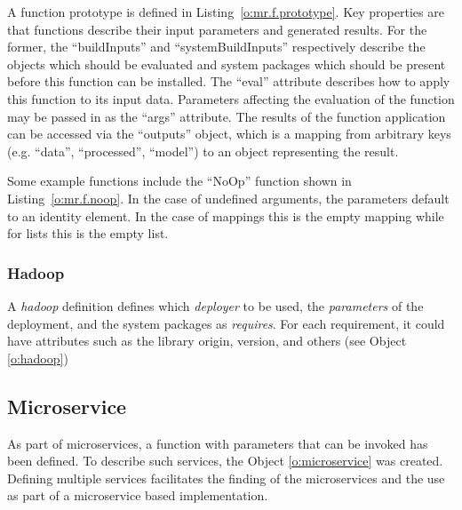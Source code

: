 \documentclass[10pt]{article}
\begin{document}
A function prototype is defined in Listing~\ref{o:mr.f.prototype}.
Key properties are that functions describe their input parameters and
generated results. For the former, the ``buildInputs'' and
``systemBuildInputs'' respectively describe the objects which should
be evaluated and system packages which should be present before this
function can be installed. The ``eval'' attribute describes how to
apply this function to its input data. Parameters affecting the
evaluation of the function may be passed in as the ``args'' attribute.
The results of the function application can be accessed via the
``outputs'' object, which is a mapping from arbitrary keys
(e.g. ``data'', ``processed'', ``model'') to an object representing
the result.



Some example functions include the ``NoOp'' function shown in
Listing~\ref{o:mr.f.noop}.  In the case of undefined arguments,
the parameters default to an identity element. In the case of mappings
this is the empty mapping while for lists this is the empty list.



\subsubsection{Hadoop}

A \textit{hadoop} definition defines which \textit{deployer} to be used,
the \textit{parameters} of the deployment, and the system packages as
\textit{requires}. For each requirement, it could have attributes such
as the library origin, version, and others (see Object \ref{o:hadoop})



\subsection{Microservice}

As part of microservices, a function with parameters that can be invoked
has been defined. To describe such services, the Object \ref {o:microservice}
was created. Defining multiple services facilitates the finding of the
microservices and the use as part of a microservice based implementation.
 
\end{document}
